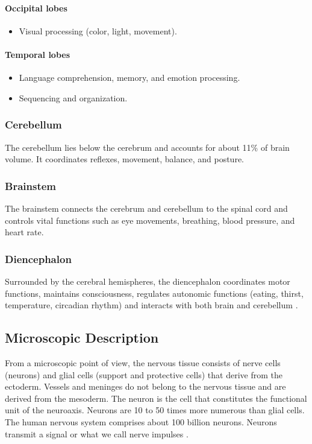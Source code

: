 \paragraph{Occipital lobes}
\begin{itemize}
  \item Visual processing (color, light, movement).
\end{itemize}

\paragraph{Temporal lobes}
\begin{itemize}
  \item Language comprehension, memory, and emotion processing.
  \item Sequencing and organization.
\end{itemize}

\subsubsection{Cerebellum}
The cerebellum lies below the cerebrum and accounts for about 11\% of brain volume. It coordinates reflexes, movement, balance, and posture.

\subsubsection{Brainstem}
The brainstem connects the cerebrum and cerebellum to the spinal cord and controls vital functions such as eye movements, breathing, blood pressure, and heart rate.

\subsubsection{Diencephalon}
Surrounded by the cerebral hemispheres, the diencephalon coordinates motor functions, maintains consciousness, regulates autonomic functions (eating, thirst, temperature, circadian rhythm) and interacts with both brain and cerebellum \cite{ref4}.
\subsection{Microscopic Description}
From a microscopic point of view, the nervous tissue consists of nerve
cells (neurons) and glial cells (support and protective cells) that derive
from the ectoderm. Vessels and meninges do not belong to the nervous
tissue and are derived from the mesoderm.
The neuron is the cell that constitutes the functional unit of the
neuroaxis. Neurons are 10 to 50 times more numerous than glial cells.
The human nervous system comprises about 100 billion neurons. Neurons
transmit a signal or what we call nerve impulses \cite{ref3}.

